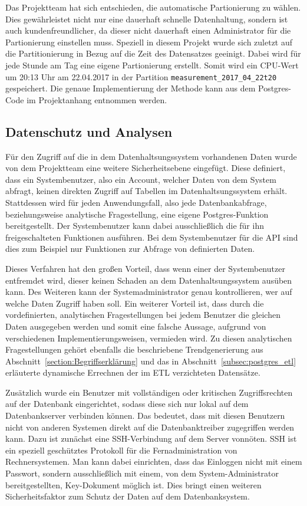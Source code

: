 Das Projektteam hat sich entschieden, die automatische Partionierung zu wählen.
Dies gewährleistet nicht nur eine dauerhaft schnelle Datenhaltung, sondern ist
auch kundenfreundlicher, da dieser nicht dauerhaft einen Administrator für die
Partionierung einstellen muss. Speziell in diesem Projekt wurde sich zuletzt
auf die Partitionierung in Bezug auf die Zeit des Datensatzes geeinigt. Dabei
wird für jede Stunde am Tag eine eigene Partionierung erstellt. Somit wird ein
CPU\hyp{}Wert um 20:13 Uhr am 22.04.2017 in der Partition
\texttt{measurement\_2017\_04\_22t20} gespeichert. Die genaue Implementierung
der Methode kann aus dem Postgres\hyp{}Code im Projektanhang entnommen werden.
\nl%

\subsection{Datenschutz und Analysen}
\label{subsec:postgres_datenschutz}
Für den Zugriff auf die in dem Datenhaltsungssystem vorhandenen Daten wurde von
dem Projektteam eine weitere Sicherheitsebene eingefügt. Diese definiert, dass
ein Systembenutzer, also ein Account, welcher Daten von dem System abfragt,
keinen direkten Zugriff auf Tabellen im Datenhaltsungssystem erhält.
Stattdessen wird für jeden Anwendungsfall, also jede Datenbankabfrage,
beziehungsweise analytische Fragestellung, eine eigene Postgres\hyp{}Funktion
bereitgestellt. Der Systembenutzer kann dabei ausschließlich die für ihn
freigeschalteten Funktionen ausführen. Bei dem Systembenutzer für die \gls{API}
sind dies zum Beispiel nur Funktionen zur Abfrage von definierten Daten.

Dieses Verfahren hat den großen Vorteil, dass wenn einer der Systembenutzer
entfremdet wird, dieser keinen Schaden an dem Datenhaltsungssystem ausüben
kann. Des Weiteren kann der Systemadministrator genau kontrollieren, wer auf
welche Daten Zugriff haben soll. Ein weiterer Vorteil ist, dass durch die
vordefinierten, analytischen Fragestellungen bei jedem Benutzer die gleichen
Daten ausgegeben werden und somit eine falsche Aussage, aufgrund von
verschiedenen Implementierungsweisen, vermieden wird. Zu diesen analytischen
Fragestellungen gehört ebenfalls die beschriebene Trendgenerierung aus
Abschnitt~\ref{section:Begriffserklärung} und das in
Abschnitt~\ref{subsec:postgres_etl} erläuterte dynamische Errechnen der im ETL
verzichteten Datensätze.

Zusätzlich wurde ein Benutzer mit vollständigen oder kritischen Zugriffsrechten
auf der Datenbank eingerichtet, sodass diese sich nur lokal auf dem
Datenbankserver verbinden können. Das bedeutet, dass mit diesen Benutzern nicht
von anderen Systemen direkt auf die Datenbanktreiber zugegriffen werden kann.
Dazu ist zunächst eine SSH\hyp{}Verbindung auf dem Server vonnöten. SSH ist ein
speziell geschütztes Protokoll für die Fernadministration von Rechnersystemen.
Man kann dabei einrichten, dass das Einloggen nicht mit einem Passwort, sondern
ausschließlich mit einem, von dem System\hyp{}Administrator bereitgestellten,
Key\hyp{}Dokument möglich ist. Dies bringt einen weiteren Sicherheitsfaktor zum
Schutz der Daten auf dem Datenbanksystem.
\nl%

